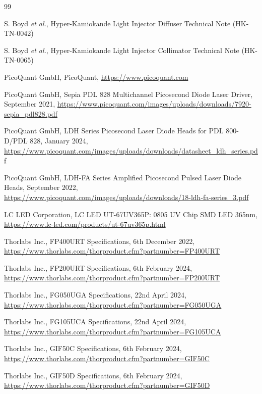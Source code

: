 \documentclass[a4paper,11pt]{article}
\begin{document}
\newpage
\begin{thebibliography}{99}

S. Boyd {\it et al.}, Hyper-Kamiokande Light Injector Diffuser Technical Note (HK-TN-0042)

S. Boyd {\it et al.}, Hyper-Kamiokande Light Injector Collimator Technical Note (HK-TN-0065)

PicoQuant GmbH, PicoQuant, \url{https://www.picoquant.com}

PicoQuant GmbH, Sepia PDL 828 Multichannel Picosecond Diode Laser Driver, September 2021, \url{https://www.picoquant.com/images/uploads/downloads/7920-sepia_pdl828.pdf}

PicoQuant GmbH, LDH Series Picosecond Laser Diode Heads for PDL 800-D/PDL 828, January 2024, \url{https://www.picoquant.com/images/uploads/downloads/datasheet_ldh_series.pdf}

PicoQuant GmbH, LDH-FA Series Amplified Picosecond Pulsed Laser Diode Heads, September 2022, \url{https://www.picoquant.com/images/uploads/downloads/18-ldh-fa-series_3.pdf}

LC LED Corporation, LC LED UT-67UV365P: 0805 UV Chip SMD LED 365nm, \url{https://www.lc-led.com/products/ut-67uv365p.html}

Thorlabs Inc., FP400URT Specifications, 6th December 2022, \url{https://www.thorlabs.com/thorproduct.cfm?partnumber=FP400URT}


Thorlabs Inc., FP200URT Specifications, 6th February 2024, \url{https://www.thorlabs.com/thorproduct.cfm?partnumber=FP200URT}

Thorlabs Inc., FG050UGA Specifications, 22nd April 2024, \url{https://www.thorlabs.com/thorproduct.cfm?partnumber=FG050UGA}

Thorlabs Inc., FG105UCA Specifications, 22nd April 2024, \url{https://www.thorlabs.com/thorproduct.cfm?partnumber=FG105UCA}

Thorlabs Inc., GIF50C Specifications, 6th February 2024, \url{https://www.thorlabs.com/thorproduct.cfm?partnumber=GIF50C}

Thorlabs Inc., GIF50D Specifications, 6th February 2024, \url{https://www.thorlabs.com/thorproduct.cfm?partnumber=GIF50D}


\end{thebibliography}
\end{document}
